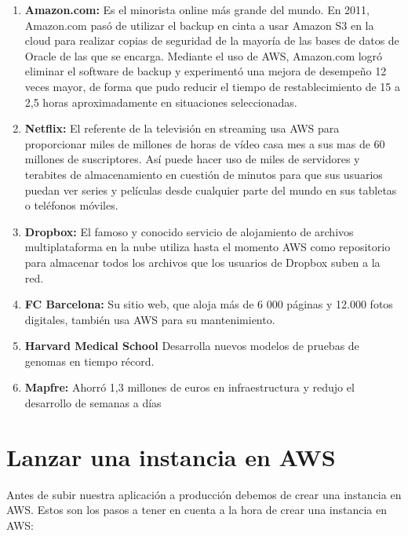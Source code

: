 \begin{enumerate}
     \item \textbf{Amazon.com: } Es el minorista online más grande del mundo. En 2011, Amazon.com pasó de utilizar el backup en cinta a usar Amazon S3 en la cloud para realizar copias de seguridad de la mayoría de las bases de datos de Oracle de las que se encarga. Mediante el uso de AWS, Amazon.com logró eliminar el software de backup y experimentó una mejora de desempeño 12 veces mayor, de forma que pudo reducir el tiempo de restablecimiento de 15 a 2,5 horas aproximadamente en situaciones seleccionadas.
    \item \textbf{Netflix: } El referente de la televisión en streaming usa AWS para proporcionar miles de millones de horas de vídeo casa mes a sus mas de 60 millones de suscriptores. Así puede hacer uso de miles de servidores y terabites de almacenamiento en cuestión de minutos para que sus usuarios puedan ver series y películas desde cualquier parte del mundo en sus tabletas o teléfonos móviles.
    \item \textbf{Dropbox: } El famoso y conocido servicio de alojamiento de archivos multiplataforma en la nube utiliza hasta el momento AWS como repositorio para almacenar todos los archivos que los usuarios de Dropbox suben a la red.
    \item \textbf{FC Barcelona: }Su sitio web, que aloja más de 6 000 páginas y 12.000 fotos digitales, también usa AWS para su mantenimiento.
    \item \textbf{Harvard Medical School} Desarrolla nuevos modelos de pruebas de genomas en tiempo récord.
    \item \textbf{Mapfre: }Ahorró 1,3 millones de euros en infraestructura y redujo el desarrollo de semanas a días

\end{enumerate}

\section{Lanzar una instancia en AWS}

Antes de subir nuestra aplicación a producción debemos de crear una instancia en AWS. Estos son los pasos a tener en cuenta a la hora de crear una instancia en AWS:

